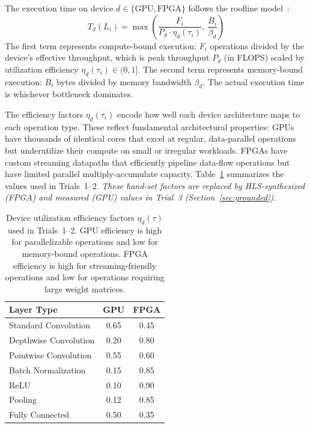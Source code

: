 \documentclass[runningheads]{llncs}
\begin{document}
The execution time on device $d \in \{\text{GPU}, \text{FPGA}\}$ follows the roofline model~\cite{roofline2009}:
\begin{equation}\label{eq:roofline}
    T_d(L_i) = \max\left(\frac{F_i}{P_d \cdot \eta_d(\tau_i)},\ \frac{B_i}{\beta_d}\right)
\end{equation}
The first term represents compute-bound execution: $F_i$ operations divided by the device's effective throughput, which is peak throughput $P_d$ (in FLOPS) scaled by utilization efficiency $\eta_d(\tau_i) \in (0, 1]$. The second term represents memory-bound execution: $B_i$ bytes divided by memory bandwidth $\beta_d$. The actual execution time is whichever bottleneck dominates.

The efficiency factors $\eta_d(\tau_i)$ encode how well each device architecture maps to each operation type. These reflect fundamental architectural properties: GPUs have thousands of identical cores that excel at regular, data-parallel operations but underutilize their compute on small or irregular workloads. FPGAs have custom streaming datapaths that efficiently pipeline data-flow operations but have limited parallel multiply-accumulate capacity. Table~\ref{tab:efficiency} summarizes the values used in Trials~1--2. \emph{These hand-set factors are replaced by HLS-synthesized (FPGA) and measured (GPU) values in Trial~3 (Section~\ref{sec:grounded}).}

\begin{table}
\caption{Device utilization efficiency factors $\eta_d(\tau)$ used in Trials~1--2. GPU efficiency is high for parallelizable operations and low for memory-bound operations. FPGA efficiency is high for streaming-friendly operations and low for operations requiring large weight matrices.}\label{tab:efficiency}
\centering
\begin{tabular}{lcc}
\toprule
\textbf{Layer Type} & \textbf{GPU} & \textbf{FPGA} \\
\midrule
Standard Convolution & 0.65 & 0.45 \\
Depthwise Convolution & 0.20 & 0.80 \\
Pointwise Convolution & 0.55 & 0.60 \\
Batch Normalization & 0.15 & 0.85 \\
ReLU & 0.10 & 0.90 \\
Pooling & 0.12 & 0.85 \\
Fully Connected & 0.50 & 0.35 \\
\bottomrule
\end{tabular}
\end{table}
\end{document}
